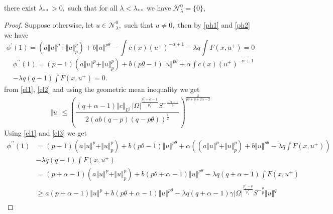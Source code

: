 \documentclass[10pt,twoside,reqno,centertags,draft]{amsart}
\begin{document}
\begin{lemma}\label{l2}
there exist $ \lambda_{**} > 0,$ such that for all $ \lambda < \lambda_{**}$ we have $ \mathcal{N}_{\lambda}^{0} = \{0\},$
\end{lemma}
\begin{proof}
Suppose otherwise, let $ u \in \mathcal{N}_{\lambda}^{0},$ such that $ u \neq 0,$ then by \ref{ph1} and \ref{ph2} we have 
\begin{equation} \label{el1}
\phi^{\prime}(1) = \left( a \Vert u \Vert^p + \Vert u \Vert_{p}^{p}\right) + b \Vert u \Vert^{p \theta}  - \int c(x)(u^+)^{-\alpha+1} - \lambda q \int F(x,u^+) = 0 
\end{equation}
\begin{equation} \label{el2}
\begin{aligned}
&\phi^{\prime \prime}(1) = (p-1) \left(a\Vert u \Vert^p + \Vert u \Vert_{p}^{p}\right) + b(p \theta - 1) \Vert u \Vert^{p \theta} + \alpha \int c(x)(u^+)^{-\alpha+1}\\ 
&- \lambda q (q-1) \int F(x,u^+) = 0.
\end{aligned}
\end{equation}
from \ref{el1}, \ref{el2} and using the geometric mean inequality we get
\begin{equation} \label{el3}
\Vert u \Vert \leq  \left( \frac{(q + \alpha -1) \Vert c \Vert _{L^{q^{\prime}}} \vert \Omega \vert^{\frac{p_s^*+ \alpha -1}{p_s^*}} S^{-\frac{-\alpha+1}{p}}}{2 \left( a b (q-p)(q -p\theta) \right)^{\frac{1}{2}}} \right)^{\frac{2}{p \theta + p +2\alpha -2 }}
\end{equation}
Using \ref{el1} and \ref{el3} we get
\footnotesize
\begin{equation}
\begin{aligned}
\phi^{\prime \prime}(1) &= (p-1) \left(a \Vert u \Vert^p + \Vert u \Vert_{p}^{p}\right) + b(p \theta - 1) \Vert u \Vert^{p \theta} + \alpha \left( \left( a \Vert u \Vert^p + \Vert u \Vert_{p}^{p}\right) + b \Vert u \Vert^{p \theta} - \lambda q \int F(x,u^+) \right)\\
&- \lambda q (q-1) \int F(x,u^+)\\
&= (p+ \alpha -1) \left(a \Vert u \Vert^p + \Vert u \Vert_{p}^{p}\right) + b(p \theta + \alpha - 1) \Vert u \Vert^{p \theta} -\lambda q (q + \alpha -1   ) \int F(x,u^+)\\
& \geq a (p+ \alpha -1) \Vert u \Vert^p + b(p \theta + \alpha - 1) \Vert u \Vert^{p \theta} -\lambda q (q + \alpha -1   )  \gamma \vert \Omega \vert^{\frac{p_s^*-q}{p_s^*}}S^{-\frac{q}{p}} \Vert u \Vert^{q}\\

\end{aligned}
\end{equation}
\end{proof}
\end{document}
